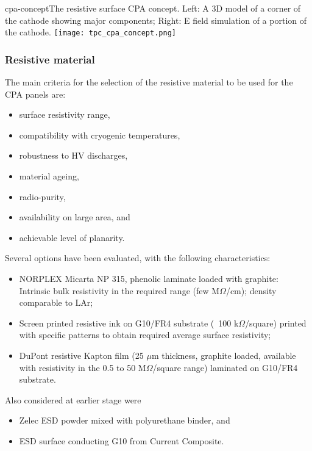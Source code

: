 \begin{cdrfigure}{cpa-concept}{The resistive surface CPA concept. 
 Left: A 3D model of a corner of the cathode showing major components;  Right: E field simulation of a portion of the cathode.} 
\texttt{[image: tpc\_cpa\_concept.png]}
\end{cdrfigure}


\subsubsection{Resistive material}

The main criteria for the selection of the resistive material to be used for the CPA panels are: 
\begin{itemize}	
\item surface resistivity range,
\item compatibility with cryogenic temperatures,
\item robustness to HV discharges, 
\item material ageing,
\item radio-purity,
\item availability on large area, and 
\item achievable level of planarity. 
\end{itemize}

Several options have been evaluated, with the following characteristics:
\begin{itemize}	
\item NORPLEX Micarta NP 315, phenolic laminate loaded with graphite: Intrinsic bulk resistivity in the required range (few M$\Omega$/cm); density comparable to LAr;
\item Screen printed resistive ink on G10/FR4 substrate (~100 k$\Omega$/square) printed with specific patterns to obtain required average surface resistivity;
\item DuPont resistive Kapton film  (25 $\mu$m thickness, graphite loaded, available with resistivity in the 0.5 to 50 M$\Omega$/square range) laminated on G10/FR4 substrate.
\end{itemize}
Also considered at earlier stage were
\begin{itemize}	
\item Zelec ESD powder mixed with polyurethane binder, and
\item ESD surface conducting G10 from Current Composite.
\end{itemize}

